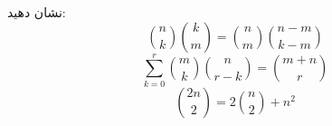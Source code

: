 \EXERCISE
نشان دهید:
$$\binom{n}{k}\binom{k}{m} = \binom{n}{m}\binom{n - m}{k - m}$$
$$\sum_{k=0}^{r} \binom{m}{k}\binom{n}{r - k} = \binom{m + n}{r}$$
$$\binom{2n}{2} = 2\binom{n}{2} + n^2$$
